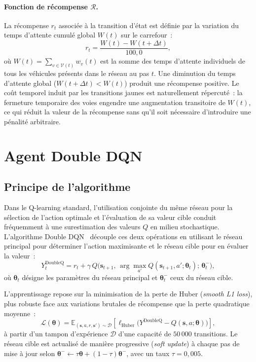 \documentclass[10pt,twocolumn,letterpaper]{article}
\begin{document}
\paragraph{Fonction de récompense $\mathcal{R}$.}
La récompense $r_t$ associée à la transition d'état est définie par la variation du temps d'attente cumulé global $W(t)$ sur le carrefour~:
\begin{equation}
\label{eq:reward}
r_t = \frac{W(t) - W(t + \Delta t)}{100{,}0},
\end{equation}
où $W(t) = \sum_{v \in \mathcal{V}(t)} w_v(t)$ est la somme des temps d'attente individuels de tous les véhicules présents dans le réseau au pas $t$. Une diminution du temps d'attente global ($W(t + \Delta t) < W(t)$) produit une récompense positive. Le coût temporel induit par les transitions jaunes est naturellement répercuté~: la fermeture temporaire des voies engendre une augmentation transitoire de $W(t)$, ce qui réduit la valeur de la récompense sans qu'il soit nécessaire d'introduire une pénalité arbitraire.

\section{Agent Double DQN}
\label{sec:algo}

\subsection{Principe de l'algorithme}
Dans le Q-learning standard, l'utilisation conjointe du même réseau pour la sélection de l'action optimale et l'évaluation de sa valeur cible conduit fréquemment à une surestimation des valeurs $Q$ en milieu stochastique. L'algorithme Double DQN~\cite{van2016deep} découple ces deux opérations en utilisant le réseau principal pour déterminer l'action maximisante et le réseau cible pour en évaluer la valeur~:
\begin{equation}
\label{eq:target_ddqn}
Y_t^{\text{DoubleQ}} = r_t + \gamma \, Q\big(\mathbf{s}_{t+1}, \, \arg\max_{a'} Q(\mathbf{s}_{t+1}, a'; \boldsymbol{\theta}_t); \, \boldsymbol{\theta}_t^-\big),
\end{equation}
où $\boldsymbol{\theta}_t$ désigne les paramètres du réseau principal et $\boldsymbol{\theta}_t^-$ ceux du réseau cible.

L'apprentissage repose sur la minimisation de la perte de Huber (\emph{smooth L1 loss}), plus robuste face aux variations brutales de récompense que la perte quadratique moyenne~:
\begin{equation}
\label{eq:loss}
\mathcal{L}(\boldsymbol{\theta}) = \mathbb{E}_{(\mathbf{s}, a, r, \mathbf{s}') \sim \mathcal{D}} \left[ \ell_{\text{Huber}}\big(Y^{\text{DoubleQ}} - Q(\mathbf{s}, a; \boldsymbol{\theta})\big) \right],
\end{equation}
à partir d'un tampon d'expérience $\mathcal{D}$ d'une capacité de $50\,000$ transitions. Le réseau cible est actualisé de manière progressive (\emph{soft update}) à chaque pas de mise à jour selon $\boldsymbol{\theta}^- \leftarrow \tau \boldsymbol{\theta} + (1 - \tau) \boldsymbol{\theta}^-$, avec un taux $\tau = 0{,}005$.
\end{document}
